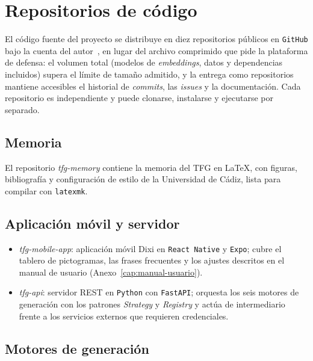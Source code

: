 \chapter{Repositorios de código}
\label{cap:repositorios}

El código fuente del proyecto se distribuye en diez repositorios públicos en \texttt{GitHub} bajo la cuenta del autor~\cite{lagares-github}, en lugar del archivo comprimido que pide la plataforma de defensa: el volumen total (modelos de \textit{embeddings}, datos y dependencias incluidos) supera el límite de tamaño admitido, y la entrega como repositorios mantiene accesibles el historial de \textit{commits}, las \textit{issues} y la documentación. Cada repositorio es independiente y puede clonarse, instalarse y ejecutarse por separado.

\section{Memoria}
\label{sec:repo-memoria}

El repositorio \textit{tfg-memory} contiene la memoria del TFG en LaTeX, con figuras, bibliografía y configuración de estilo de la Universidad de Cádiz, lista para compilar con \texttt{latexmk}.

\section{Aplicación móvil y servidor}
\label{sec:repo-aplicacion}

\begin{itemize}
    \item \textit{tfg-mobile-app}: aplicación móvil Dixi en \texttt{React Native} y \texttt{Expo}; cubre el tablero de pictogramas, las frases frecuentes y los ajustes descritos en el manual de usuario (Anexo~\ref{cap:manual-usuario}).
    \item \textit{tfg-api}: servidor REST en \texttt{Python} con \texttt{FastAPI}; orquesta los seis motores de generación con los patrones \textit{Strategy} y \textit{Registry} y actúa de intermediario frente a los servicios externos que requieren credenciales.
\end{itemize}

\section{Motores de generación}
\label{sec:repo-motores}

